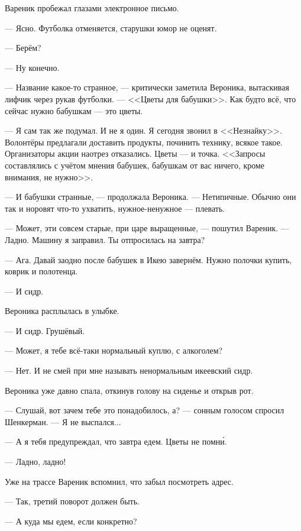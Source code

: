 Вареник пробежал глазами электронное письмо.

--- Ясно.
Футболка отменяется, старушки юмор не оценят.

--- Берём?

--- Ну конечно.

\asterism

\textspace

--- Название какое-то странное, --- критически заметила Вероника, вытаскивая лифчик через рукав футболки.
--- <<Цветы для бабушки>>.
Как будто всё, что сейчас нужно бабушкам --- это цветы.

--- Я сам так же подумал.
И не я один.
Я сегодня звонил в <<Незнайку>>.
Волонтёры предлагали доставить продукты, починить технику, всякое такое.
Организаторы акции наотрез отказались.
Цветы --- и точка.
<<Запросы составлялись с учётом мнения бабушек, бабушкам от вас ничего, кроме внимания, не нужно>>.

--- И бабушки странные, --- продолжала Вероника.
--- Нетипичные.
Обычно они так и норовят что-то ухватить, нужное-ненужное --- плевать.

--- Может, эти совсем старые, при царе выращенные, --- пошутил Вареник.
--- Ладно.
Машину я заправил.
Ты отпросилась на завтра?

--- Ага.
Давай заодно после бабушек в Икею завернём.
Нужно полочки купить, коврик и полотенца.

--- И сидр.

Вероника расплылась в улыбке.

--- И сидр.
Грушёвый.

--- Может, я тебе всё-таки нормальный куплю, с алкоголем?

--- Нет.
И не смей при мне называть ненормальным икеевский сидр.

\asterism

\textspace

Вероника уже давно спала, откинув голову на сиденье и открыв рот.

--- Слушай, вот зачем тебе это понадобилось, а? --- сонным голосом спросил Шенкерман.
--- Я не выспался...

--- А я тебя предупреждал, что завтра едем.
Цветы не помн\'и.

--- Ладно, ладно!

Уже на трассе Вареник вспомнил, что забыл посмотреть адрес.

--- Так, третий поворот должен быть.

--- А куда мы едем, если конкретно?

